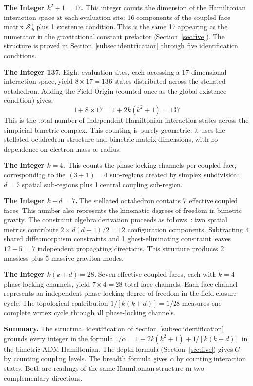\documentclass[aps,prd,preprint,superscriptaddress,showpacs,preprintnumbers,amsmath,amssymb,nofootinbib]{revtex4-2}
\begin{document}
\textbf{The Integer $k^2 + 1 = 17$.}
This integer counts the dimension of the Hamiltonian interaction space at each evaluation site: 16 components of the coupled face matrix $\mathcal{S}^a_{\;b}$ plus 1 existence condition. This is the same 17 appearing as the numerator in the gravitational constant prefactor (Section~\ref{sec:five}). The structure is proved in Section~\ref{subsec:identification} through five identification conditions.

\textbf{The Integer 137.}
Eight evaluation sites, each accessing a 17-dimensional interaction space, yield $8 \times 17 = 136$ states distributed across the stellated octahedron. Adding the Field Origin (counted once as the global existence condition) gives:
\begin{equation}
1 + 8 \times 17 = 1 + 2k(k^2 + 1) = 137
\end{equation}
This is the total number of independent Hamiltonian interaction states across the simplicial bimetric complex. This counting is purely geometric: it uses the stellated octahedron structure and bimetric matrix dimensions, with no dependence on electron mass or radius.

\textbf{The Integer $k = 4$.}
This counts the phase-locking channels per coupled face, corresponding to the $(3+1) = 4$ sub-regions created by simplex subdivision: $d = 3$ spatial sub-regions plus 1 central coupling sub-region.

\textbf{The Integer $k + d = 7$.}
The stellated octahedron contains 7 effective coupled faces. This number also represents the kinematic degrees of freedom in bimetric gravity. The constraint algebra derivation proceeds as follows~\cite{hassan2012}: two spatial metrics contribute $2 \times d(d+1)/2 = 12$ configuration components. Subtracting 4 shared diffeomorphism constraints and 1 ghost-eliminating constraint leaves $12 - 5 = 7$ independent propagating directions. This structure produces 2 massless plus 5 massive graviton modes.

\textbf{The Integer $k(k+d) = 28$.}
Seven effective coupled faces, each with $k = 4$ phase-locking channels, yield $7 \times 4 = 28$ total face-channels. Each face-channel represents an independent phase-locking degree of freedom in the field-closure cycle. The topological contribution $1/[k(k+d)] = 1/28$ measures one complete vortex cycle through all phase-locking channels.

\textbf{Summary.}
The structural identification of Section~\ref{subsec:identification} grounds every integer in the formula $1/\alpha = 1 + 2k(k^2 + 1) + 1/[k(k{+}d)]$ in the bimetric ADM Hamiltonian. The depth formula (Section~\ref{sec:five}) gives $G$ by counting coupling levels. The breadth formula gives $\alpha$ by counting interaction states. Both are readings of the same Hamiltonian structure in two complementary directions.
\end{document}
